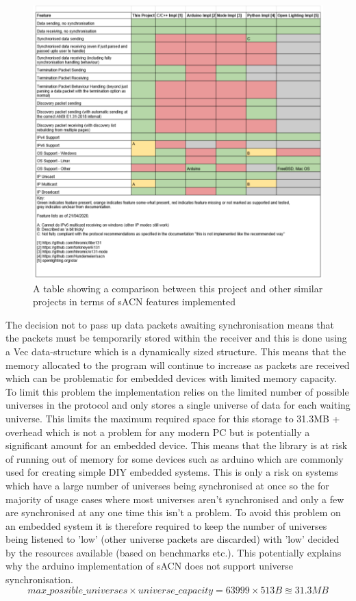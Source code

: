 \documentclass[11pt,a4paper]{article}
\begin{document}
\begin{figure}[H]
	\includegraphics[width=\textwidth]{lib-comparison}
	\caption{A table showing a comparison between this project and other similar projects in terms of sACN features implemented}
	\label{LIB_COMPARISON}
\end{figure}

The decision not to pass up data packets awaiting synchronisation means that the packets must be temporarily stored within the receiver and this is done using a Vec data-structure which is a dynamically sized structure. This means that the memory allocated to the program will continue to increase as packets are received which can be problematic for embedded devices with limited memory capacity. To limit this problem the implementation relies on the limited number of possible universes in the protocol and only stores a single universe of data for each waiting universe. This limits the maximum required space for this storage to 31.3MB + overhead which is not a problem for any modern PC but is potentially a significant amount for an embedded device. This means that the library is at risk of running out of memory for some devices such as arduino \cite{ARDUINO} which are commonly used for creating simple DIY embedded systems. This is only a risk on systems which have a large number of universes being synchronised at once so the for majority of usage cases where most universes aren't synchronised and only a few are synchronised at any one time this isn't a problem. To avoid this problem on an embedded system it is therefore required to keep the number of universes being listened to 'low' (other universe packets are discarded) with 'low' decided by the resources available (based on benchmarks etc.). This potentially explains why the arduino implementation of sACN \cite{ARDUINO_IMPL} does not support universe synchronisation.\\
\[ 
\textit{max\_possible\_universes} \times \textit{universe\_capacity} = 63999 \times 513 B \approxeq 31.3 MB
\]
\end{document}
